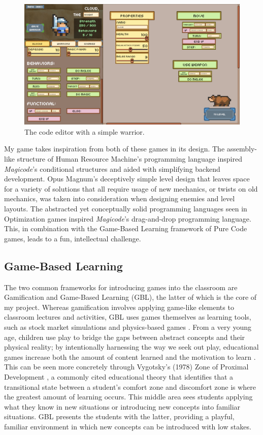 \documentclass[10pt,twocolumn]{article}
\begin{document}
\begin{figure}
    \centering
    \includegraphics[width=\linewidth]{images/screenshots/cloud_editor.png}
    \caption{The code editor with a simple warrior.}
    \label{fig:code-editor-screenshot}
\end{figure}

My game takes inspiration from both of these games in its design. The assembly-like structure of Human Resource Machine’s programming language inspired \textit{Magicode}’s conditional structures and aided with simplifying backend development. Opus Magnum’s deceptively simple level design that leaves space for a variety of solutions that all require usage of new mechanics, or twists on old mechanics, was taken into consideration when designing enemies and level layouts. The abstracted yet conceptually solid programming languages seen in Optimization games inspired \textit{Magicode}'s drag-and-drop programming language. This, in combination with the Game-Based Learning framework of Pure Code games, leads to a fun, intellectual challenge.

\subsection{Game-Based Learning}
The two common frameworks for introducing games into the classroom are Gamification and Game-Based Learning (GBL), the latter of which is the core of my project. Whereas gamification involves applying game-like elements to classroom lectures and activities, GBL uses games themselves as learning tools, such as stock market simulations and physics-based games \cite{gbl-waterloo}. From a very young age, children use play to bridge the gaps between abstract concepts and their physical reality; by intentionally harnessing the way we seek out play, educational games increase both the amount of content learned and the motivation to learn \cite{foundations-gbl}. This can be seen more concretely through Vygotsky’s (1978) Zone of Proximal Development \cite{vygotsky}, a commonly cited educational theory that identifies that a transitional state between a student’s comfort zone and discomfort zone is where the greatest amount of learning occurs. This middle area sees students applying what they know in new situations or introducing new concepts into familiar situations. GBL presents the students with the latter, providing a playful, familiar environment in which new concepts can be introduced with low stakes.
\end{document}
